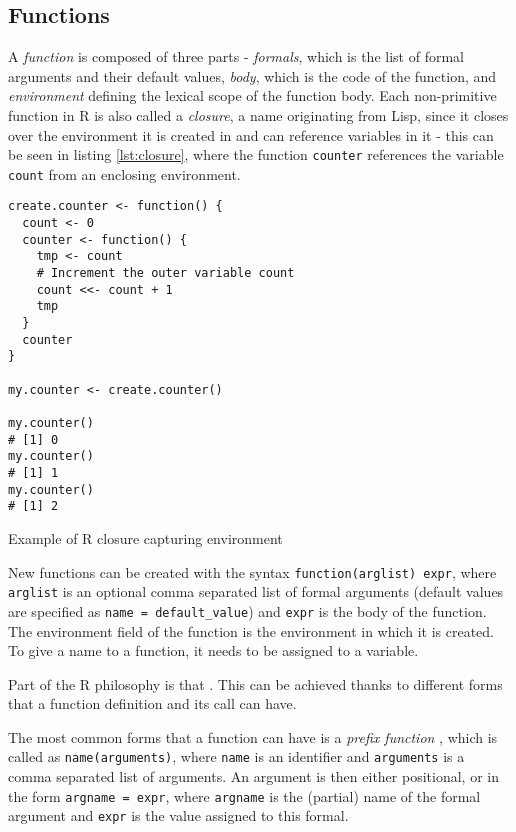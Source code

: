 \subsection*{Functions}

A \textit{function} is composed of three parts - \textit{formals}, which is the list of formal arguments and their default values, \textit{body}, which is the code of the function, and \textit{environment} defining the lexical scope of the function body. Each non-primitive function in R is also called a \textit{closure}, a name originating from Lisp, since it closes over the environment it is created in and can reference variables in it - this can be seen in listing \ref{lst:closure}, where the function \texttt{counter} references the variable \texttt{count} from an enclosing environment.

\begin{listing}[h!]
	\centering
	\begin{verbatim}
create.counter <- function() {
  count <- 0
  counter <- function() {
    tmp <- count
    # Increment the outer variable count
    count <<- count + 1
    tmp
  }
  counter
}

my.counter <- create.counter()

my.counter()
# [1] 0
my.counter()
# [1] 1
my.counter()
# [1] 2
  \end{verbatim}
	\caption{Example of R closure capturing environment}\label{lst:closure}
\end{listing}

New functions can be created with the syntax \texttt{function(arglist) expr}, where \texttt{arglist} is an optional comma separated list of formal arguments (default values are specified as \texttt{name = default\_value}) and \texttt{expr} is the body of the function. The environment field of the function is the environment in which it is created. To give a name to a function, it needs to be assigned to a variable.

Part of the R philosophy is that \todocite. This can be achieved thanks to different forms that a function definition and its call can have.

The most common forms that a function can have is a \textit{prefix function} , which is called as \texttt{name(arguments)}, where \texttt{name} is an identifier and \texttt{arguments} is a comma separated list of arguments. An argument is then either positional, or in the form \texttt{argname = expr}, where \texttt{argname} is the (partial) name of the formal argument and \texttt{expr} is the value assigned to this formal.

